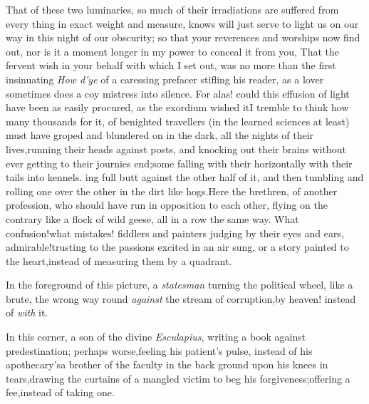 \documentclass{article}
\begin{document}
That of these two luminaries, so much of their irradiations are
suffered from
every thing in exact weight and
measure, knows will just serve to light us on our way in this night
of our obscurity; so that your reverences and worships now find
out, nor is it a moment longer in my power to conceal it from you,
That the fervent wish in your behalf with which I set out, was no
more than the first insinuating \textit{How d’ye} of a
caressing prefacer stifling his reader, as a lover sometimes does
a coy mistress into silence. For alas! could this effusion of
light have been as easily procured, as the exordium wished it\tsk I tremble to think how many
thousands for it, of benighted travellers (in the learned sciences
at least) must have groped and blundered on in the dark, all the
nights of their lives,\tsh running their heads against
posts, and knocking out
their brains without ever getting to their
journies end;\tsk some falling with their 
 horizontally with
their tails into kennels.\break
{}
ing full butt against the other half of it, and then tumbling
and rolling one over the other in the dirt like hogs.\tsk Here
the brethren, of another profession, who should have run in
opposition to each other, flying on the contrary like a flock of
wild geese, all in a row the same way.\break
\tsk What confusion!\tsk what mistakes!\break
\tsh fiddlers and painters judging by their eyes and ears,\tsk
admirable!\tsk trusting to the passions excited in an air
sung, or a story painted to the heart,\tsk instead of measuring
them by a quadrant.

In the foreground of this picture, a \textit{statesman} turning
the political wheel, like a brute, the wrong way round\tsh
\textit{against} the stream of corruption,\tsk by heaven!\tsh
instead of \textit{with} it.

In this corner, a son of the divine \textit{Esculapius}, writing a
book against predestination; perhaps worse,\tsk feeling his
patient’s pulse, instead of his
apothecary’s\break\tsk a brother of the faculty in the
back ground upon his knees in tears,\tsk drawing the curtains of a
mangled victim to beg his forgiveness;\tsk offering a
fee,\tsk instead of taking one.
\end{document}

